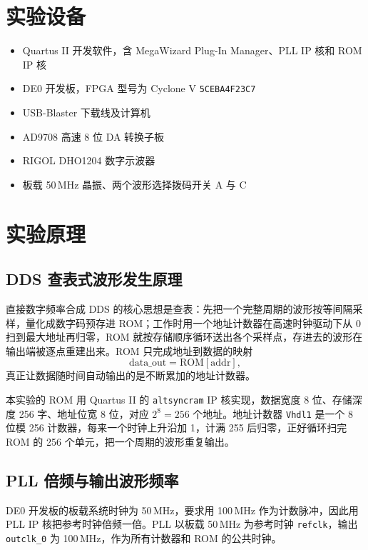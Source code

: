 \documentclass{ctexrep}
\begin{document}
\section{实验设备}

\begin{itemize}
    \item Quartus II 开发软件，含 MegaWizard Plug-In Manager、PLL IP 核和 ROM IP 核
    \item DE0 开发板，FPGA 型号为 Cyclone V \texttt{5CEBA4F23C7}
    \item USB-Blaster 下载线及计算机
    \item AD9708 高速 8 位 DA 转换子板
    \item RIGOL DHO1204 数字示波器
    \item 板载 50\,MHz 晶振、两个波形选择拨码开关 A 与 C
\end{itemize}

\section{实验原理}

\subsection{DDS 查表式波形发生原理}

直接数字频率合成 DDS 的核心思想是查表：先把一个完整周期的波形按等间隔采样，量化成数字码预存进 ROM；工作时用一个地址计数器在高速时钟驱动下从 0 扫到最大地址再归零，ROM 就按存储顺序循环送出各个采样点，存进去的波形在输出端被逐点重建出来。ROM 只完成地址到数据的映射
\[
    \mathrm{data\_out} = \mathrm{ROM}[\mathrm{addr}],
\]
真正让数据随时间自动输出的是不断累加的地址计数器。

本实验的 ROM 用 Quartus II 的 \texttt{altsyncram} IP 核实现，数据宽度 8 位、存储深度 256 字、地址位宽 8 位，对应 $2^8 = 256$ 个地址。地址计数器 \texttt{Vhdl1} 是一个 8 位模 256 计数器，每来一个时钟上升沿加 1，计满 255 后归零，正好循环扫完 ROM 的 256 个单元，把一个周期的波形重复输出。

\subsection{PLL 倍频与输出波形频率}

DE0 开发板的板载系统时钟为 50\,MHz，要求用 100\,MHz 作为计数脉冲，因此用 PLL IP 核把参考时钟倍频一倍。PLL 以板载 50\,MHz 为参考时钟 \texttt{refclk}，输出 \texttt{outclk\_0} 为 100\,MHz，作为所有计数器和 ROM 的公共时钟。
\end{document}

